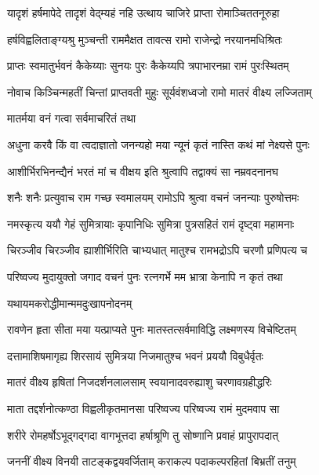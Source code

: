 \twolineshloka
{यादृशं हर्षमापेदे तादृशं वेद्म्यहं नहि}
{उत्थाय चाजिरे प्राप्ता रोमाञ्चिततनूरुहा}%

\twolineshloka
{हर्षविह्वलिताङ्ग्यश्रु मुञ्चन्ती राममैक्षत}
{तावत्स रामो राजेन्द्रो नरयानमधिश्रितः}%

\twolineshloka
{प्राप्तः स्वमातुर्भवनं कैकेय्याः सुनयः पुरः}
{कैकेय्यपि त्रपाभारनम्रा रामं पुरःस्थितम्}%

\twolineshloka
{नोवाच किञ्चिन्महतीं चिन्तां प्राप्तवती मुहुः}
{सूर्यवंशध्वजो रामो मातरं वीक्ष्य लज्जिताम्}%



\onelineshloka
{मातर्मया वनं गत्वा सर्वमाचरितं तथा}%

\twolineshloka
{अधुना करवै किं वा त्वदाज्ञातो जनन्यहो}
{मया न्यूनं कृतं नास्ति कथं मां नेक्ष्यसे पुनः}%

\twolineshloka
{आशीर्भिरभिनन्द्यैनं भरतं मां च वीक्षय}
{इति श्रुत्वापि तद्वाक्यं सा नम्रवदनानघ}%

\twolineshloka
{शनैः शनैः प्रत्युवाच राम गच्छ स्वमालयम्}
{रामोऽपि श्रुत्वा वचनं जनन्याः पुरुषोत्तमः}%

\twolineshloka
{नमस्कृत्य ययौ गेहं सुमित्रायाः कृपानिधिः}
{सुमित्रा पुत्रसहितं रामं दृष्ट्वा महामनाः}%

\twolineshloka
{चिरञ्जीव चिरञ्जीव ह्याशीर्भिरिति चाभ्यधात्}
{मातुश्च रामभद्रोऽपि चरणौ प्रणिपत्य च}%

\twolineshloka
{परिष्वज्य मुदायुक्तो जगाद वचनं पुनः}
{रत्नगर्भे मम भ्रात्रा केनापि न कृतं तथा}%

\onelineshloka
{यथायमकरोद्धीमान्ममदुःखापनोदनम्}%

\twolineshloka
{रावणेन हृता सीता मया यत्प्राप्यते पुनः}
{मातस्तत्सर्वमाविद्धि लक्ष्मणस्य विचेष्टितम्}%

\twolineshloka
{दत्तामाशिषमागृह्य शिरसायं सुमित्रया}
{निजमातुश्च भवनं प्रययौ विबुधैर्वृतः}%

\twolineshloka
{मातरं वीक्ष्य हृषितां निजदर्शनलालसाम्}
{स्वयानादवरुह्याशु चरणावग्रहीद्धरिः}%

\twolineshloka
{माता तद्दर्शनोत्कण्ठा विह्वलीकृतमानसा}
{परिष्वज्य परिष्वज्य रामं मुदमवाप सा}%

\twolineshloka
{शरीरे रोमहर्षोऽभूद्गद्गदा वागभूत्तदा}
{हर्षाश्रूणि तु सोष्णानि प्रवाहं प्रापुरापदात्}%

\twolineshloka
{जननीं वीक्ष्य विनयी ताटङ्कद्वयवर्जिताम्}
{कराकल्प पदाकल्परहितां बिभ्रतीं तनुम्}%

